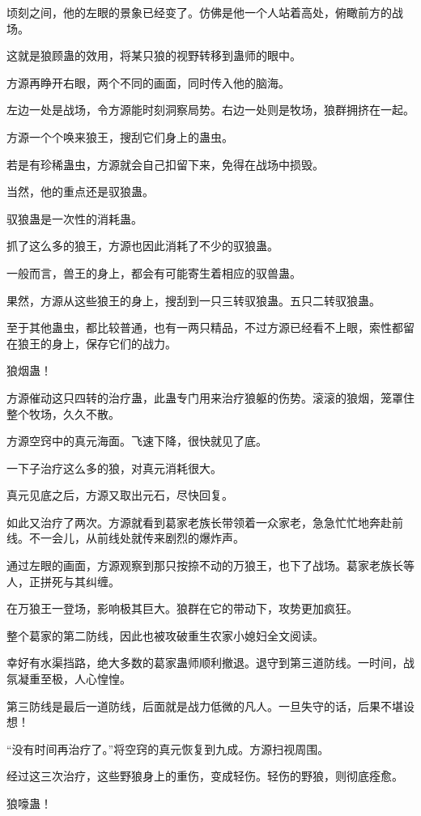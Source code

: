 \begin{this_body}
顷刻之间，他的左眼的景象已经变了。仿佛是他一个人站着高处，俯瞰前方的战场。

这就是狼顾蛊的效用，将某只狼的视野转移到蛊师的眼中。

方源再睁开右眼，两个不同的画面，同时传入他的脑海。

左边一处是战场，令方源能时刻洞察局势。右边一处则是牧场，狼群拥挤在一起。

方源一个个唤来狼王，搜刮它们身上的蛊虫。

若是有珍稀蛊虫，方源就会自己扣留下来，免得在战场中损毁。

当然，他的重点还是驭狼蛊。

驭狼蛊是一次性的消耗蛊。

抓了这么多的狼王，方源也因此消耗了不少的驭狼蛊。

一般而言，兽王的身上，都会有可能寄生着相应的驭兽蛊。

果然，方源从这些狼王的身上，搜刮到一只三转驭狼蛊。五只二转驭狼蛊。

至于其他蛊虫，都比较普通，也有一两只精品，不过方源已经看不上眼，索性都留在狼王的身上，保存它们的战力。

狼烟蛊！

方源催动这只四转的治疗蛊，此蛊专门用来治疗狼躯的伤势。滚滚的狼烟，笼罩住整个牧场，久久不散。

方源空窍中的真元海面。飞速下降，很快就见了底。

一下子治疗这么多的狼，对真元消耗很大。

真元见底之后，方源又取出元石，尽快回复。

如此又治疗了两次。方源就看到葛家老族长带领着一众家老，急急忙忙地奔赴前线。不一会儿，从前线处就传来剧烈的爆炸声。

通过左眼的画面，方源观察到那只按捺不动的万狼王，也下了战场。葛家老族长等人，正拼死与其纠缠。

在万狼王一登场，影响极其巨大。狼群在它的带动下，攻势更加疯狂。

整个葛家的第二防线，因此也被攻破重生农家小媳妇全文阅读。

幸好有水渠挡路，绝大多数的葛家蛊师顺利撤退。退守到第三道防线。一时间，战氛凝重至极，人心惶惶。

第三防线是最后一道防线，后面就是战力低微的凡人。一旦失守的话，后果不堪设想！

“没有时间再治疗了。”将空窍的真元恢复到九成。方源扫视周围。

经过这三次治疗，这些野狼身上的重伤，变成轻伤。轻伤的野狼，则彻底痊愈。

狼嚎蛊！


\end{this_body}
